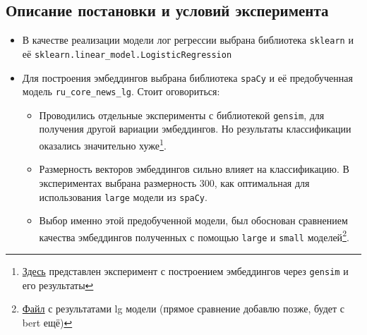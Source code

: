 \documentclass{article}
\begin{document}
\subsection{Описание постановки и условий эксперимента}
\begin{itemize}
    \item[\circ] В качестве реализации модели лог регрессии выбрана библиотека \texttt{sklearn} и её \texttt{sklearn.linear\_model.LogisticRegression}
    \item[\circ] Для построения эмбеддингов выбрана библиотека \texttt{spaCy} и её предобученная модель \texttt{ru\_core\_news\_lg}. Стоит оговориться:
    \begin{itemize}
        \item Проводились отдельные эксперименты с библиотекой \texttt{gensim}, для получения другой вариации эмбеддингов. Но результаты классификации оказались значительно хуже\footnote{\href{https://github.com/intsystems/2024-Project-142/blob/master/code/try-gensim.ipynb}{Здесь} представлен эксперимент с построением эмбеддингов через \texttt{gensim} и его результаты}.
        \item Размерность векторов эмбеддингов сильно влияет на классификацию. В экспериментах выбрана размерность 300, как оптимальная для использования \texttt{large} модели из \texttt{spaCy}.
        \item Выбор именно этой предобученной модели, был обоснован сравнением качества эмбеддингов полученных с помощью \texttt{large} и \texttt{small} моделей\footnote{\href{https://github.com/intsystems/2024-Project-142/blob/master/code/after_talk-2_lg_embeddings_200k.ipynb}{Файл} с результатами lg модели (прямое сравнение добавлю позже, будет с bert ещё)}.
    \end{itemize}
    
\end{itemize}
\end{document}
